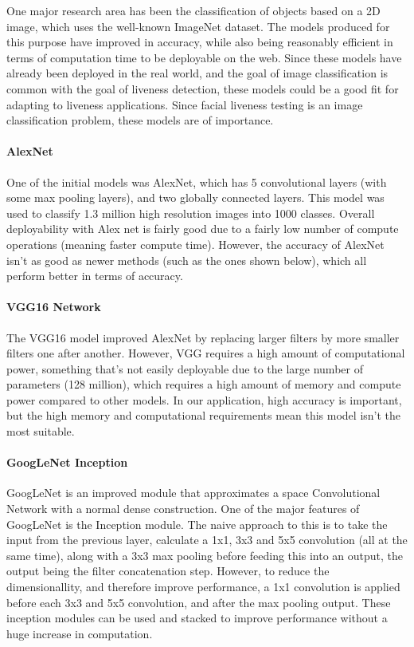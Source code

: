 \documentclass[11pt,a4paper]{article}
\begin{document}
        One major research area has been the classification of objects based on a 2D image, which uses the well-known ImageNet dataset. The models produced for this purpose have improved in accuracy,
        while also being reasonably efficient in terms of computation time to be deployable on the web. Since these models have already been deployed in the real world, and the goal of image classification
        is common with the goal of liveness detection, these models could be a good fit for adapting to liveness applications. Since facial liveness testing is
        an image classification problem, these models are of importance.
        
        \paragraph{AlexNet} 
        One of the initial models was AlexNet, which has 5 convolutional layers (with some max pooling layers), and two globally connected layers.
        This model was used to classify 1.3 million high resolution images into 1000 classes. \cite{AlexNet} Overall deployability
        with Alex net is fairly good due to a fairly low number of compute operations (meaning faster compute time). \cite{DeepNeuralNetworkDeployability} However, the accuracy of AlexNet isn't
        as good as newer methods (such as the ones shown below), which all perform better in terms of accuracy. 
        
        \paragraph{VGG16 Network}
        The VGG16 model improved AlexNet by replacing larger filters by more smaller filters one after another.
        However, VGG requires a high amount of computational power, something that's not easily deployable due to
        the large number of parameters (128 million), which requires a high amount of memory and compute power compared
        to other models. \cite{DeepNeuralNetworkDeployability} In our application, high accuracy is important, but the high
        memory and computational requirements mean this model isn't the most suitable.

        \paragraph{GoogLeNet Inception}
        GoogLeNet is an improved module that approximates a space Convolutional Network with a normal
        dense construction. One of the major features of GoogLeNet is the Inception module. The naive approach to this 
        is to take the input from the previous layer, calculate a 1x1, 3x3 and 5x5 convolution (all at the same time), along with
        a 3x3 max pooling before feeding this into an output, the output being the filter concatenation step.
        However, to reduce the dimensionallity, and therefore improve performance, a 1x1 convolution is applied before
        each 3x3 and 5x5 convolution, and after the max pooling output. These inception modules can be used and stacked
        to improve performance without a huge increase in computation. \cite{GoogLeNet} 
 
\end{document}
